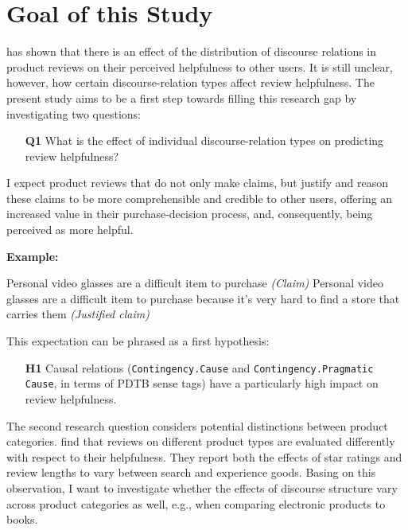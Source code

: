 \documentclass[
    a4paper,%
    12pt,%
    oneside,%
    toc=bibliography,
    final,
]{scrartcl}
\begin{document}
\section{Goal of this Study}
\label{sec:goal}

\citet{Golly2017} has shown that there is an effect of the distribution of discourse relations in product reviews on their perceived helpfulness to other users. It is still unclear, however, how certain discourse-relation types affect review helpfulness. The present study aims to be a first step towards filling this research gap by investigating two questions:

\begin{enumerate}[rightmargin=1cm]
\item[\textbf{Q1}] What is the effect of individual discourse-relation types on predicting review helpfulness?
\end{enumerate}

I expect product reviews that do not only make claims, but justify and reason these claims to be more comprehensible and credible to other users, offering an increased value in their purchase-decision process, and, consequently, being perceived as more helpful.

\textbf{Example:}
\vspace{-1em}

\begin{exe}
\ex Personal video glasses are a difficult item to purchase \textit{(Claim)}
\ex Personal video glasses are a difficult item to purchase because it’s very hard to find a store that carries them \textit{(Justified claim)}
\end{exe}
\vspace{-.5em}

This expectation can be phrased as a first hypothesis:

\begin{enumerate}[rightmargin=1cm]
\item[\textbf{H1}] Causal relations (\lstinline|Contingency.Cause| and \lstinline|Contingency.Pragmatic Cause|, in terms of PDTB sense tags) have a particularly high impact on review helpfulness.
\end{enumerate}

The second research question considers potential distinctions between product categories. \citet{MudambiSchuff2010} find that reviews on different product types are evaluated differently with respect to their helpfulness. They report both the effects of star ratings and review lengths to vary between search and experience goods. Basing on this observation, I want to investigate whether the effects of discourse structure vary across product categories as well, e.g., when comparing electronic products to books.
\end{document}

